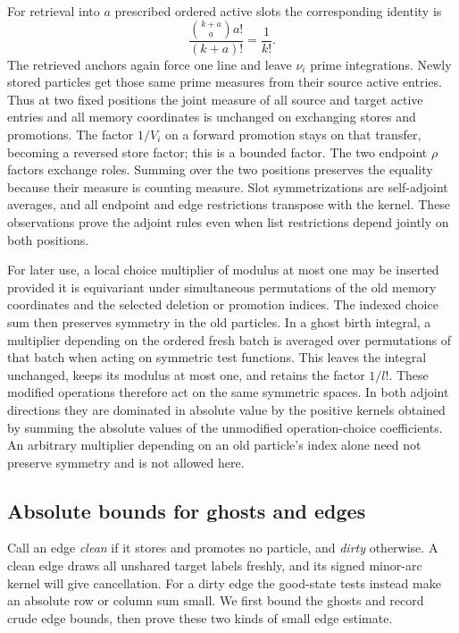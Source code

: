 For retrieval into $a$ prescribed ordered active slots the corresponding
identity is
\begin{equation}\label{mem:edge-factorial}
 \frac{\binom{k+a}{a}a!}{(k+a)!}=\frac{1}{k!}.
\end{equation}
The retrieved anchors again force one line and leave $\nu_i$ prime
integrations. Newly stored particles get those same prime measures
from their source active entries. Thus at two fixed positions the
joint measure of all source and target active entries and all memory
coordinates is unchanged on exchanging stores and promotions. The
factor $1/V_i$ on a forward promotion stays on that transfer, becoming
a reversed store factor; this is a bounded factor. The two endpoint
$\rho$ factors exchange roles. Summing over the two positions
preserves the equality because their measure is counting measure.
Slot symmetrizations are self-adjoint averages, and all endpoint and
edge restrictions transpose with the kernel. These observations
prove the adjoint rules even when list restrictions depend jointly
on both positions.

For later use, a local choice multiplier of modulus at most one may be
inserted provided it is equivariant under simultaneous permutations of
the old memory coordinates and the selected deletion or promotion
indices. The indexed choice sum then preserves symmetry in the old
particles. In a ghost birth integral, a multiplier depending on the
ordered fresh batch is averaged over permutations of that batch when
acting on symmetric test functions. This leaves the integral unchanged,
keeps its modulus at most one, and retains the factor $1/l!$. These
modified operations therefore act on the same symmetric spaces. In
both adjoint directions they are dominated in absolute value by the
positive kernels obtained by summing the absolute values of the
unmodified operation-choice coefficients. An arbitrary multiplier depending
on an old particle's index alone need not preserve symmetry and is not
allowed here.

\subsection{Absolute bounds for ghosts and edges}

Call an edge \emph{clean} if it stores and promotes no particle, and
\emph{dirty} otherwise. A clean edge draws all unshared target labels
freshly, and its signed minor-arc kernel will give cancellation.
For a dirty edge the good-state tests instead make an absolute row or
column sum small. We first bound the ghosts and record crude edge
bounds, then prove these two kinds of small edge estimate.

